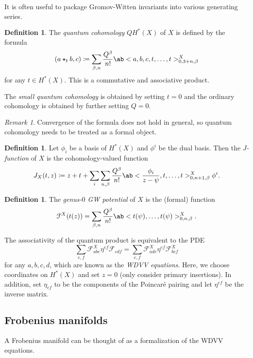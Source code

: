\documentclass[leqno, openany]{memoir}
\theoremstyle{definition}
\newtheorem{defn}[thm]{Definition}
\theoremstyle{remark}
\newtheorem{rmk}[thm]{Remark}
\theoremstyle{plain}
\theoremstyle{definition}
\theoremstyle{remark}
\newcommand{\mc}[1]{\mathcal{#1}}
\begin{document}
It is often useful to package Gromov-Witten invariants into various generating series.

\begin{defn}
    The \textit{quantum cohomology} $QH^*(X)$ of $X$ is defined by the formula
    \[ (a \star_t b, c) \coloneqq \sum_{\beta, n} \frac{Q^{\beta}}{n!} \ab<a,b,c,t,\ldots,t>_{0,3+n,\beta}^X \]
    for any $t \in H^*(X)$. This is a commutative and associative product.
\end{defn}
The \textit{small quantum cohomology} is obtained by setting $t=0$ and the ordinary cohomology is obtained by further setting $Q=0$.
\begin{rmk}
    Convergence of the formula does not hold in general, so quantum cohomology needs to be treated as a formal object.
\end{rmk}

\begin{defn}\label{defn:jfunction}
    Let $\phi_i$ be a basis of $H^*(X)$ and $\phi^i$ be the dual basis. Then the \textit{$J$-function} of $X$ is the cohomology-valued function
    \[ J_X(t,z) \coloneqq z + t + \sum_i \sum_{n,\beta} \frac{Q^{\beta}}{n!} \ab<\frac{\phi_i}{z-\psi}, t, \ldots, t>_{0,n+1,\beta}^X \phi^i. \]
\end{defn}

\begin{defn}
    The \textit{genus-$0$ GW potential} of $X$ is the (formal) function
    \[ \mc{F}^X(t(z)) = \sum_{\beta, n} \frac{Q^{\beta}}{n!} \ab<t(\psi), \ldots, t(\psi)>_{0,n,\beta}^X. \]
\end{defn}

The associativity of the quantum product is equivalent to the PDE
\[ \sum_{e,f} \mc{F}^X_{abe} \eta^{ef} \mc{F}_{cdf} = \sum_{e,f} \mc{F}^X_{ade} \eta^{ef} \mc{F}^X_{bcf} \]
for any $a,b,c,d$, which are known as the \textit{WDVV equations}. Here, we choose coordinates on $H^*(X)$ and set $z=0$ (only consider primary insertions). In addition, set $\eta_{ef}$ to be the components of the Poincar\'e pairing and let $\eta^{ef}$ be the inverse matrix.


\subsection{Frobenius manifolds}

A Frobenius manifold can be thought of as a formalization of the WDVV equations.
\end{document}
